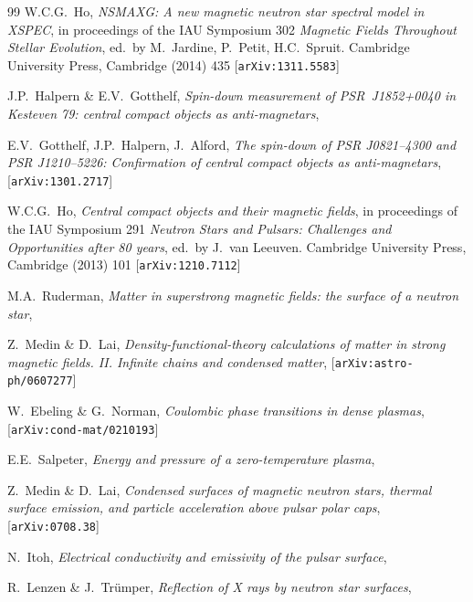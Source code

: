 \documentclass{pos1}
\begin{document}
\begin{thebibliography}{99}
W.C.G.~Ho,
\textit{NSMAXG: A new magnetic neutron star spectral model in XSPEC},
in proceedings of the IAU Symposium 302
\textit{Magnetic Fields Throughout Stellar Evolution},
ed.~by M.~Jardine, P.~Petit, H.C.~Spruit.
Cambridge University Press, Cambridge (2014) 435
[\texttt{arXiv:1311.5583}]

J.P.~Halpern \& E.V.~Gotthelf,
\textit{Spin-down measurement of PSR~J1852+0040 in Kesteven 79: central compact objects as anti-magnetars},

E.V.~Gotthelf, J.P.~Halpern, J.~Alford,
\textit{The spin-down of PSR J0821--4300 and PSR J1210--5226: Confirmation of central compact objects as anti-magnetars},
[\texttt{arXiv:1301.2717}]

W.C.G.~Ho,
\textit{Central compact objects and their magnetic fields},
in proceedings of the IAU Symposium 291
\textit{Neutron Stars and Pulsars: Challenges and Opportunities
after 80 years},
ed.~by J.~van Leeuven.
Cambridge University Press, Cambridge (2013) 101
[\texttt{arXiv:1210.7112}]

M.A.~Ruderman,
\textit{Matter in superstrong magnetic fields: the surface of a neutron star},

Z.~Medin \& D.~Lai,
\textit{Density-functional-theory calculations of matter in strong magnetic fields. II. Infinite chains and condensed matter},
[\texttt{arXiv:astro-ph/0607277}]

W.~Ebeling \& G.~Norman,
\textit{Coulombic phase transitions in dense plasmas},
[\texttt{arXiv:cond-mat/0210193}]

E.E.~Salpeter,
\textit{Energy and pressure of a zero-temperature plasma},

Z.~Medin \& D.~Lai,
\textit{Condensed surfaces of magnetic neutron stars, thermal surface emission, and particle acceleration above pulsar polar caps},
[\texttt{arXiv:0708.38}]

N.~Itoh,
\textit{Electrical conductivity and emissivity of the pulsar surface},

R.~Lenzen \& J.~Tr\"umper,
\textit{Reflection of X rays by neutron star surfaces},


\end{thebibliography}
\end{document}
